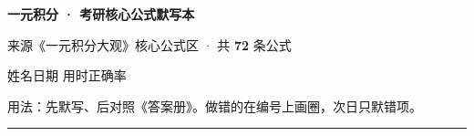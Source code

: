 \documentclass[11pt,a4paper]{article}
\begin{document}
{\sffamily\bfseries\LARGE\color{secc}一元积分 · 考研核心公式默写本}\par
\vspace{0.35em}
{\small\color{mute}来源《一元积分大观》核心公式区 · 共 \textbf{72} 条公式}\par
\vspace{0.6em}
{\small 姓名\underline{\hspace{2.1cm}}\quad 日期\underline{\hspace{2.1cm}}\quad
 用时\underline{\hspace{1.5cm}}\quad 正确率\underline{\hspace{1.5cm}}}\par
\vspace{0.4em}
{\small\color{mute}用法：先默写、后对照《答案册》。做错的在编号上画圈，次日只默错项。}\par
\vspace{0.5em}
{\color{ruleg}\rule{\linewidth}{1.1pt}}\par
\vspace{0.9em}
\end{document}
